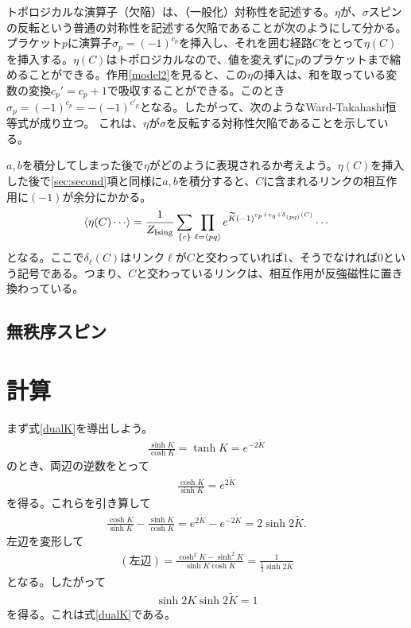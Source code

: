 \documentclass[a4paper,12pt,dvipdfmx]{jlreq}
\newcommand{\Kt}{\widetilde{K}}
\newcommand{\ZIs}{Z_{\mathrm{Ising}}}
\begin{document}
トポロジカルな演算子（欠陥）は、（一般化）対称性を記述する。$\eta$が、$\sigma$スピンの反転という普通の対称性を記述する欠陥であることが次のようにして分かる。プラケット$p$に演算子$\sigma_{p}=(-1)^{c_p}$を挿入し、それを囲む経路$C$をとって$\eta(C)$を挿入する。$\eta(C)$はトポロジカルなので、値を変えずに$p$のプラケットまで縮めることができる。作用\eqref{model2}を見ると、この$\eta$の挿入は、和を取っている変数の変換$c_p'=c_p+1$で吸収することができる。このとき$\sigma_{p}=(-1)^{c_p}=-(-1)^{c'_p}$となる。したがって、次のようなWard-Takahashi恒等式が成り立つ。
これは、$\eta$が$\sigma$を反転する対称性欠陥であることを示している。

$a,b$を積分してしまった後で$\eta$がどのように表現されるか考えよう。$\eta(C)$を挿入した後で\ref{sec:second}項と同様に$a,b$を積分すると、$C$に含まれるリンクの相互作用に$(-1)$が余分にかかる。
\begin{align}
  \expval{\eta(C)\cdots}
  =\frac{1}{\ZIs}\sum_{\{c\}}\prod_{\ell=\expval{pq}} e^{\Kt(-1)^{c_p+c_q+\delta_{\expval{pq}}(C)}}\cdots
\end{align}
となる。ここで$\delta_{\ell}(C)$はリンク$\ell$が$C$と交わっていれば$1$、そうでなければ$0$という記号である。つまり、$C$と交わっているリンクは、相互作用が反強磁性に置き換わっている。
\subsection{無秩序スピン}


\appendix
\section{計算}
\label{sec:calculation}
まず式\eqref{dualK}を導出しよう。
\begin{align}
  \frac{\sinh K}{\cosh K}=\tanh K = e^{-2\Kt}
  \label{KKt}
\end{align}
のとき、両辺の逆数をとって
\begin{align}
  \frac{\cosh K}{ \sinh K} = e^{2\Kt}
\end{align}
を得る。これらを引き算して
\begin{align}
  \frac{\cosh K}{\sinh K}-\frac{\sinh K}{\cosh K}=e^{2\Kt}-e^{-2\Kt}=2\sinh 2\Kt.
\end{align}
左辺を変形して
\begin{align}
  (\text{左辺})=\frac{\cosh^2K-\sinh^2 K}{\sinh K \cosh K}=\frac{1}{\frac{1}{2}\sinh 2K}
\end{align}
となる。したがって
\begin{align}
  \sinh 2K \sinh 2\Kt =1
\end{align}
を得る。これは式\eqref{dualK}である。
\end{document}
